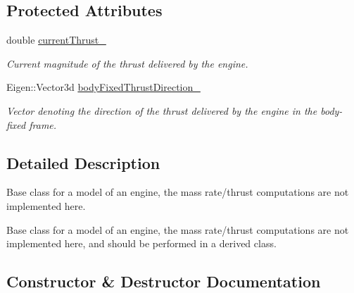 \subsection*{Protected Attributes}
\begin{DoxyCompactItemize}
\item 
double \hyperlink{classtudat_1_1system__models_1_1EngineModel_ac10cbda6bb73094700c6cef241d5224a}{current\+Thrust\+\_\+}\hypertarget{classtudat_1_1system__models_1_1EngineModel_ac10cbda6bb73094700c6cef241d5224a}{}\label{classtudat_1_1system__models_1_1EngineModel_ac10cbda6bb73094700c6cef241d5224a}

\begin{DoxyCompactList}\small\item\em Current magnitude of the thrust delivered by the engine. \end{DoxyCompactList}\item 
Eigen\+::\+Vector3d \hyperlink{classtudat_1_1system__models_1_1EngineModel_af77579b23f705ecc3ac02532ef1ab147}{body\+Fixed\+Thrust\+Direction\+\_\+}
\begin{DoxyCompactList}\small\item\em Vector denoting the direction of the thrust delivered by the engine in the body-\/fixed frame. \end{DoxyCompactList}\end{DoxyCompactItemize}


\subsection{Detailed Description}
Base class for a model of an engine, the mass rate/thrust computations are not implemented here. 

Base class for a model of an engine, the mass rate/thrust computations are not implemented here, and should be performed in a derived class. 

\subsection{Constructor \& Destructor Documentation}
